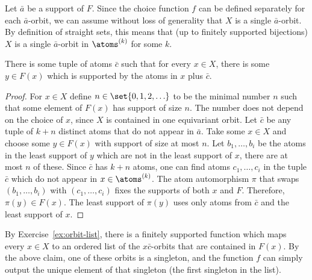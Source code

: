 { 
 Let $\bar a$ be a support of $F$.
 Since the choice function $f$ can be defined separately for each $\bar a$-orbit, we can assume without loss of generality that $X$ is a single $\bar a$-orbit. By definition of straight sets, this means that (up to finitely supported bijections) $X$ is a single $\bar a$-orbit in $\atoms^{(k)}$ for some $k$. 

 \begin{claim}
 There is some tuple of atoms $\bar c$ such that for every $x \in X$, there is some $y \in F(x)$ which is supported by the atoms in $x$ plus $\bar c$.
 \end{claim}
 \begin{proof} For $x \in X$ define $n \in \set{0,1,2,\ldots}$ to be the minimal number $n$ such that some element of $F(x)$ has support of size $n$. 
 The number does not depend on the choice of $x$, since $X$ is contained in one equivariant orbit. Let $\bar c$ be any tuple of $k+n$ distinct atoms that do not appear in $\bar a$. Take some $x \in X$ and choose some $y \in F(x)$ with support of size at most $n$. Let $b_1,\ldots,b_i$ be the atoms in the least support of $y$ which are not in the least support of $x$, there are at most $n$ of these. Since $\bar c$ has $k+n$ atoms, one can find atoms $c_1,\ldots,c_i$ in the tuple $\bar c$ which do not appear in $x \in \atoms^{(k)}$. The atom automorphism $\pi$ that swaps $(b_1,\ldots,b_i)$ with $(c_1,\ldots,c_i)$ fixes the supports of both $x$ and $F$. Therefore, $\pi(y) \in F(x)$. The least support of $\pi(y)$ uses only atoms from $\bar c$ and the least support of $x$. 
 \end{proof}

 By Exercise~\ref{ex:orbit-list}, there is a finitely supported function which maps every $x \in X$ to an ordered list of the $x \bar c$-orbits that are contained in $F(x)$. By the above claim, one of these orbits is a singleton, and the function $f$ can simply output the unique element of that singleton (the first singleton in the list).
}

